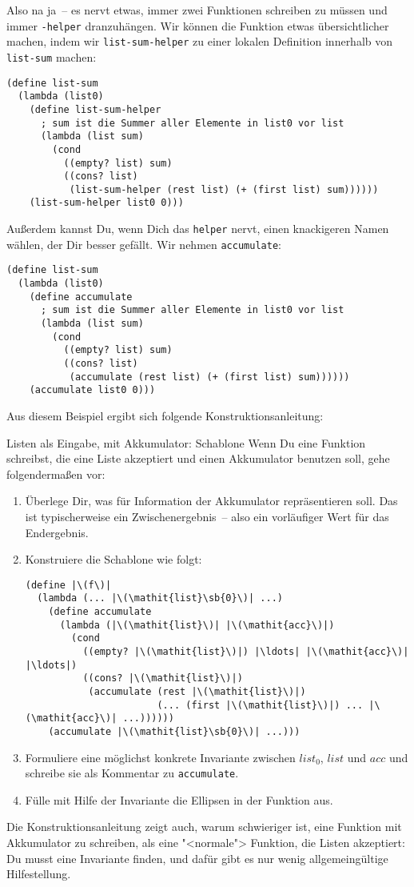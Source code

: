 Also na ja~-- es nervt etwas, immer zwei Funktionen schreiben zu müssen
und immer \lstinline{-helper} dranzuhängen.  Wir können die Funktion
etwas übersichtlicher machen, indem wir \lstinline{list-sum-helper} zu einer
lokalen Definition innerhalb von \lstinline{list-sum} machen:
%
\begin{lstlisting}
(define list-sum
  (lambda (list0)
    (define list-sum-helper
      ; sum ist die Summer aller Elemente in list0 vor list
      (lambda (list sum)
        (cond
          ((empty? list) sum)
          ((cons? list)
           (list-sum-helper (rest list) (+ (first list) sum))))))
    (list-sum-helper list0 0)))
\end{lstlisting}
%
Außerdem kannst Du, wenn Dich das \lstinline{helper} nervt, einen
knackigeren Namen wählen, der Dir besser gefällt.  Wir nehmen
\lstinline{accumulate}:
%
\begin{lstlisting}
(define list-sum
  (lambda (list0)
    (define accumulate
      ; sum ist die Summer aller Elemente in list0 vor list
      (lambda (list sum)
        (cond
          ((empty? list) sum)
          ((cons? list)
           (accumulate (rest list) (+ (first list) sum))))))
    (accumulate list0 0)))
\end{lstlisting}
%
Aus diesem Beispiel ergibt sich folgende Konstruktionsanleitung:
%
\begin{konstruktionsanleitung}{Listen als Eingabe, mit Akkumulator: Schablone}
  \label{ka:listen-eingabe-akkumulator-schablone}
  Wenn Du eine Funktion schreibst, die eine Liste akzeptiert und
  einen Akkumulator benutzen soll, gehe folgendermaßen vor:
  \begin{enumerate}
  \item Überlege Dir, was für Information der Akkumulator
    repräsentieren soll. Das ist typischerweise ein
    Zwischenergebnis~-- also ein vorläufiger Wert für das Endergebnis.
  \item Konstruiere die Schablone wie folgt:
\begin{lstlisting}
(define |\(f\)|
  (lambda (... |\(\mathit{list}\sb{0}\)| ...)
    (define accumulate
      (lambda (|\(\mathit{list}\)| |\(\mathit{acc}\)|)
        (cond
          ((empty? |\(\mathit{list}\)|) |\ldots| |\(\mathit{acc}\)| |\ldots|)
          ((cons? |\(\mathit{list}\)|)
           (accumulate (rest |\(\mathit{list}\)|) 
                       (... (first |\(\mathit{list}\)|) ... |\(\mathit{acc}\)| ...))))))
    (accumulate |\(\mathit{list}\sb{0}\)| ...)))
\end{lstlisting}
    \item Formuliere eine möglichst konkrete Invariante zwischen
      $\mathit{list}_0$, $\mathit{list}$ und $\mathit{acc}$ und
      schreibe sie als Kommentar zu \lstinline{accumulate}.
    \item Fülle mit Hilfe der Invariante die Ellipsen in der Funktion aus.
  \end{enumerate}
\end{konstruktionsanleitung}
%
Die Konstruktionsanleitung zeigt auch, warum schwieriger ist, eine
Funktion mit Akkumulator zu schreiben, als eine "<normale"> Funktion,
die Listen akzeptiert: Du musst eine Invariante finden, und dafür gibt
es nur wenig allgemeingültige Hilfestellung.

